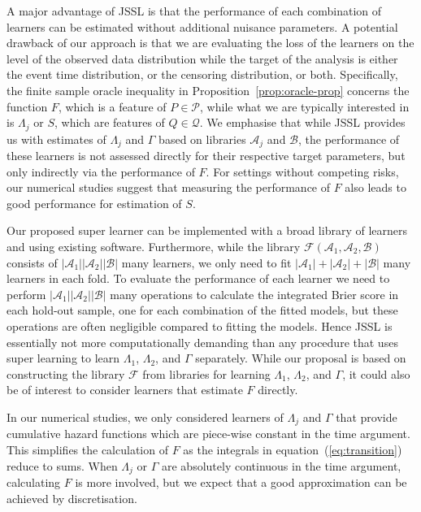 \documentclass[a4paper,danish]{article}
\theoremstyle{plain} %
\numberwithin{theorem}{section}
\theoremstyle{definition} %
\theoremstyle{remark}
\newcommand{\1}{\mathds{1}}
\begin{document}
A major advantage of JSSL is that the performance of each
combination of learners can be estimated without additional nuisance
parameters. A potential drawback of our approach is that we are
evaluating the loss of the learners on the level of the observed data
distribution while the target of the analysis is either the event time
distribution, or the censoring distribution, or both.
Specifically, the finite sample oracle inequality in
Proposition~\ref{prop:oracle-prop} concerns the function \( F \), which
is a feature of \( P \in \mathcal{P} \), while what we are typically
interested in is \( \Lambda_j \) or \( S \), which are features of
\( Q \in \mathcal{Q} \). We emphasise that while JSSL
provides us with estimates of \( \Lambda_j \) and $\Gamma$ based on
libraries \( \mathcal{A}_j \) and \( \mathcal{B} \), the performance
of these learners is not assessed directly for their respective target
parameters, but only indirectly via the performance of \( F \).  For
settings without competing risks, our numerical studies suggest that
measuring the performance of \( F \) also leads to good performance
for estimation of \( S \).

Our proposed super learner can be implemented with a broad library of learners
and using existing software.
Furthermore, while
the library \( \mathcal{F}(\mathcal{A}_1,\mathcal{A}_2,\mathcal{B}) \) consists
of \( |\mathcal{A}_1||\mathcal{A}_2||\mathcal{B}| \) many learners, we only need to fit
\( |\mathcal{A}_1| +|\mathcal{A}_2| + |\mathcal{B}| \) many learners in each fold. To
evaluate the performance of each learner we need to perform
\( |\mathcal{A}_1||\mathcal{A}_2||\mathcal{B}| \) many operations to calculate the
integrated Brier score in each hold-out sample, one for each combination of the
fitted models, but these operations are often negligible compared to fitting the
models. Hence JSSL is essentially not more computationally demanding
than any procedure that uses super learning to learn $\Lambda_1$, $\Lambda_2$,
and $\Gamma$ separately. While our proposal is based on constructing the library
\( \mathcal{F} \) from libraries for learning \( \Lambda_1 \), $\Lambda_2$, and
$\Gamma$, it could also be of interest to consider learners that estimate
\( F \) directly.

In our numerical studies, we only considered learners of $\Lambda_j$ and
$\Gamma$ that provide cumulative hazard functions which are piece-wise constant
in the time argument. This simplifies the calculation of \( F \) as the
integrals in equation~(\ref{eq:transition}) reduce to sums. When $\Lambda_j$ or
\( \Gamma \) are absolutely continuous in the time argument, calculating \( F \)
is more involved, but we expect that a good approximation can be achieved by
discretisation.
\end{document}

